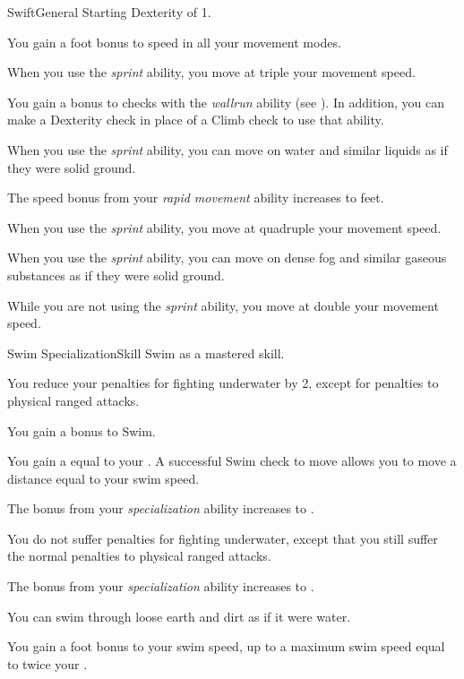     \begin{feat}{Swift}{General}
        \featpre Starting Dexterity of 1.

         You gain a  foot bonus to speed in all your movement modes.

         When you use the \textit{sprint} ability, you move at triple your movement speed.

         You gain a  bonus to checks with the \textit{wallrun} ability (see ).
        In addition, you can make a Dexterity check in place of a Climb check to use that ability.

         When you use the \textit{sprint} ability, you can move on water and similar liquids as if they were solid ground.

         The speed bonus from your \textit{rapid movement} ability increases to  feet.

         When you use the \textit{sprint} ability, you move at quadruple your movement speed.

         When you use the \textit{sprint} ability, you can move on dense fog and similar gaseous substances as if they were solid ground.

         While you are not using the \textit{sprint} ability, you move at double your movement speed.
    \end{feat}

    \begin{feat}{Swim Specialization}{Skill}
        \featpre Swim as a mastered skill.

         You reduce your penalties for fighting underwater by 2, except for penalties to physical ranged attacks.

         You gain a  bonus to Swim.

         You gain a  equal to your .
        A successful Swim check to move allows you to move a distance equal to your swim speed.

         The bonus from your \textit{specialization} ability increases to .

         You do not suffer penalties for fighting underwater, except that you still suffer the normal penalties to physical ranged attacks.

         The bonus from your \textit{specialization} ability increases to .

         You can swim through loose earth and dirt as if it were water.

         You gain a  foot bonus to your swim speed, up to a maximum swim speed equal to twice your .
    \end{feat}


